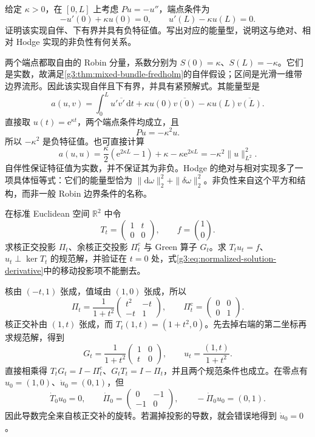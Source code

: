 \begin{exercise}\label{g3:ex:robin-negative-eigenvalue}
	给定 \(\kappa>0\)，在 \([0,L]\) 上考虑 \(Pu=-u''\)，端点条件为
	\[
		-u'(0)+\kappa u(0)=0,\qquad
		u'(L)-\kappa u(L)=0.
	\]
	证明该实现自伴、下有界并具有负特征值。写出对应的能量型，说明这与绝对、相对 Hodge 实现的非负性有何关系。
\end{exercise}
\begin{solution}
	两个端点都取自由的 Robin 分量，系数分别为 \(S(0)=\kappa\)、\(S(L)=-\kappa\)。它们是实数，故满足\cref{g3:thm:mixed-bundle-fredholm}的自伴假设；区间是光滑一维带边界流形。因此该实现自伴且下有界，并具有紧预解式。其能量型是
	\[
		a(u,v)=\int_0^L u'\overline{v'}\,\mathrm dt
		+\kappa u(0)\overline{v(0)}
		-\kappa u(L)\overline{v(L)}.
	\]
	直接取 \(u(t)=\mathrm e^{\kappa t}\)，两个端点条件均成立，且
	\[
		Pu=-\kappa^2u.
	\]
	所以 \(-\kappa^2\) 是负特征值。也可直接计算
	\[
		a(u,u)=\frac\kappa2(\mathrm e^{2\kappa L}-1)
		+\kappa-\kappa\mathrm e^{2\kappa L}
		=-\kappa^2\|u\|_{L^2}^2.
	\]
	自伴性保证特征值为实数，并不保证其为非负。Hodge 的绝对与相对实现多了一项具体恒等式：它们的能量型恰为 \(\|\mathrm d\omega\|_2^2+\|\delta\omega\|_2^2\)。非负性来自这个平方和结构，而非一般 Robin 边界条件的名称。
\end{solution}

\begin{exercise}\label{g3:ex:moving-kernel-normalization}
	在标准 Euclidean 空间 \(\mathbb R^2\) 中令
	\[
		T_t=\begin{pmatrix}1&t\\0&0\end{pmatrix},\qquad f=\binom10.
	\]
	求核正交投影 \(\Pi_t\)、余核正交投影 \(\Pi_t^{\mathrm c}\) 与 Green 算子 \(G_t\)。求 \(T_tu_t=f\)、\(u_t\perp\ker T_t\) 的规范解，并验证在 \(t=0\) 处，式\eqref{g3:eq:normalized-solution-derivative}中的移动投影项不能删去。
\end{exercise}
\begin{solution}
	核由 \((-t,1)\) 张成，值域由 \((1,0)\) 张成，所以
	\[
		\Pi_t=\frac1{1+t^2}\begin{pmatrix}t^2&-t\\-t&1\end{pmatrix},
		\qquad\Pi_t^{\mathrm c}=\begin{pmatrix}0&0\\0&1\end{pmatrix}.
	\]
	核正交补由 \((1,t)\) 张成，而 \(T_t(1,t)=(1+t^2,0)\)。先去掉右端的第二坐标再求规范解，得到
	\[
		G_t=\frac1{1+t^2}\begin{pmatrix}1&0\\t&0\end{pmatrix},
		\qquad u_t=\frac{(1,t)}{1+t^2}.
	\]
	直接相乘得 \(T_tG_t=I-\Pi_t^{\mathrm c}\)、\(G_tT_t=I-\Pi_t\)，并且两个规范条件也成立。在零点有 \(u_0=(1,0)\)、\(\dot u_0=(0,1)\)，但
	\[
		\dot T_0u_0=0,\qquad
		\dot\Pi_0=\begin{pmatrix}0&-1\\-1&0\end{pmatrix},\qquad
		-\dot\Pi_0u_0=(0,1).
	\]
	因此导数完全来自核正交补的旋转。若漏掉投影的导数，就会错误地得到 \(\dot u_0=0\)。
\end{solution}

